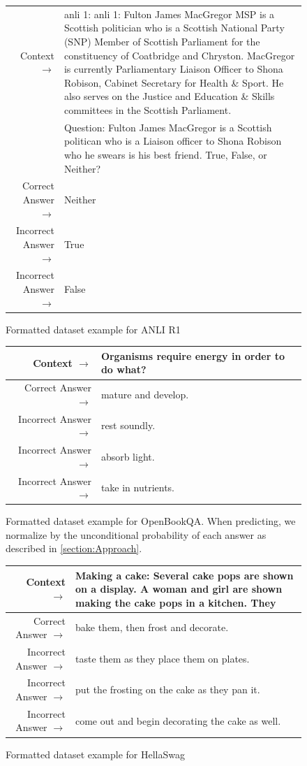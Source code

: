 \documentclass{article}
\begin{document}
\begin{figure} { \tt \footnotesize \begin{tabularx}{\linewidth}{r X} \toprule Context $\to$ & anli 1: anli 1: Fulton James MacGregor MSP is a Scottish politician who is a Scottish National Party (SNP) Member of Scottish Parliament for the constituency of Coatbridge and Chryston. MacGregor is currently Parliamentary Liaison Officer to Shona Robison, Cabinet Secretary for Health \& Sport. He also serves on the Justice and Education \& Skills committees in the Scottish Parliament. \\ 
 & Question: Fulton James MacGregor is a Scottish politican who is a Liaison officer to Shona Robison who he swears is his best friend. True, False, or Neither? \\ 
 \midrule Correct Answer $\to$ & Neither \\ 
 Incorrect Answer $\to$ & True \\ 
 Incorrect Answer $\to$ & False\\ \bottomrule \end{tabularx} }  \caption{Formatted dataset example for ANLI R1}  \label{eval:ANLI R1}  \end{figure}
\begin{figure} { \tt \footnotesize \begin{tabularx}{\linewidth}{r X} \toprule Context $\to$ & Organisms require energy in order to do what? \\ 
 \midrule Correct Answer $\to$ & mature and develop. \\ 
 Incorrect Answer $\to$ & rest soundly. \\ 
 Incorrect Answer $\to$ & absorb light. \\ 
 Incorrect Answer $\to$ & take in nutrients.\\ \bottomrule \end{tabularx} }  \caption{Formatted dataset example for OpenBookQA. When predicting, we normalize by the unconditional probability of each answer as described in \ref{section:Approach}.}  \label{eval:OpenBookQA}  \end{figure}
\begin{figure} { \tt \footnotesize \begin{tabularx}{\linewidth}{r X} \toprule Context $\to$ & Making a cake: Several cake pops are shown on a display. A woman and girl are shown making the cake pops in a kitchen. They \\ 
 \midrule Correct Answer $\to$ & bake them, then frost and decorate. \\ 
 Incorrect Answer $\to$ & taste them as they place them on plates. \\ 
 Incorrect Answer $\to$ & put the frosting on the cake as they pan it. \\ 
 Incorrect Answer $\to$ & come out and begin decorating the cake as well.\\ \bottomrule \end{tabularx} }  \caption{Formatted dataset example for HellaSwag}  \label{eval:HellaSwag}  \end{figure}
\end{document}
